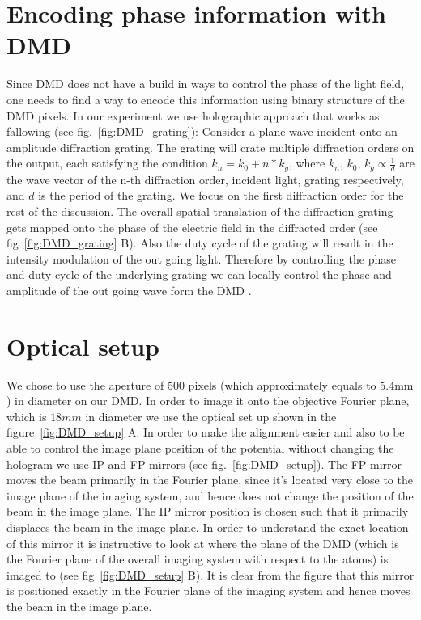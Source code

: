 \section{Encoding phase information with DMD}
Since DMD does not have a build in ways to control the phase of the light field, one needs to find a way to encode this information using binary structure of the DMD pixels. In our experiment we use holographic approach that works as fallowing (see fig.~\ref{fig:DMD_grating}): Consider a plane wave incident onto an amplitude diffraction grating. The grating will crate multiple diffraction orders on the output, each satisfying the condition $k_n = k_0 + n*k_g$, where $k_n$, $k_0$, $k_g \propto \frac{1}{d}$ are the wave vector of the n-th diffraction order, incident light, grating respectively, and $d$ is the period of the grating. We focus on the first diffraction order for the rest of the discussion. The overall spatial translation of the diffraction grating gets mapped onto the phase of the electric field in the diffracted order (see fig~\ref{fig:DMD_grating} B). Also the duty cycle of the grating will result in the intensity modulation of the out going light. Therefore by controlling the phase and duty cycle of the underlying grating we can locally control the phase and amplitude of the out going wave form the DMD \cite{Zupanchich thesis}.

\section{Optical setup}
We chose to use the aperture of $500$ pixels (which approximately equals to $5.4 \mathrm{mm}$) in diameter on our DMD. In order to image it onto the objective Fourier plane, which is $18 mm$ in diameter we use the optical set up shown in the figure~\ref{fig:DMD_setup} A. In order to make the alignment easier and also to be able to control the image plane position of the potential without changing the hologram we use IP and FP mirrors (see fig.~\ref{fig:DMD_setup}). The FP mirror moves the beam primarily in the Fourier plane, since it's located very close to the image plane of the imaging system, and hence does not change the position of the beam in the image plane. The IP mirror position is chosen such that it primarily displaces the beam in the image plane. In order to understand the exact location of this mirror it is instructive to look at where the plane of the DMD (which is the Fourier plane of the overall imaging system with respect to the atoms) is imaged to (see fig~\ref{fig:DMD_setup} B). It is clear from the figure that this mirror is positioned exactly in the Fourier plane of the imaging system and hence moves the beam in the image plane.

